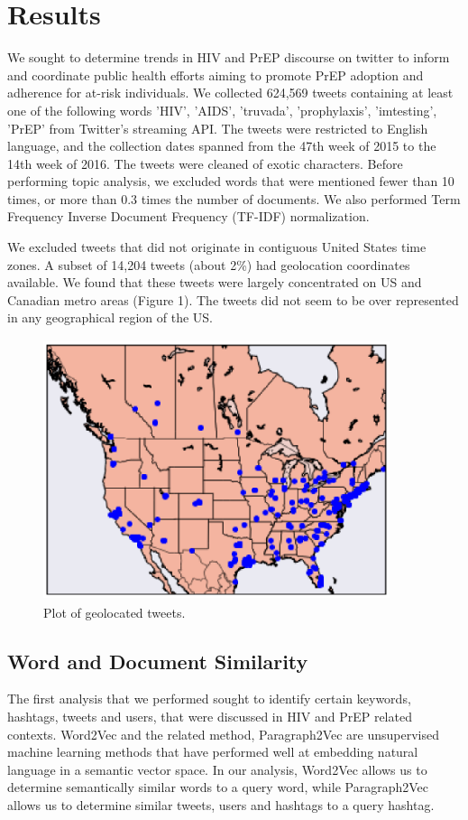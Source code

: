 \documentclass{sig-alternate-05-2015}
\begin{document}
\section{Results}
We sought to determine trends in HIV and PrEP discourse on twitter to inform and coordinate public health efforts aiming to promote PrEP adoption and adherence for at-risk individuals. We collected 624,569 tweets containing at least one of the following words 'HIV', 'AIDS', 'truvada', 'prophylaxis', 'imtesting', 'PrEP' from Twitter's streaming API. The tweets were restricted to English language, and the collection dates spanned from the 47th week of 2015 to the 14th week of 2016. The tweets were cleaned of exotic characters. Before performing topic analysis, we excluded words that were mentioned fewer than 10 times, or more than 0.3 times the number of documents. We also performed Term Frequency Inverse Document Frequency (TF-IDF) normalization.

We excluded tweets that did not originate in contiguous United States time zones. A subset of 14,204 tweets (about 2\%) had geolocation coordinates available. We found that these tweets were largely concentrated on US and Canadian metro areas (Figure 1). The tweets did not seem to be over represented in any geographical region of the US.


\begin{figure}
\centering
\includegraphics[height=3in, width=4in]{map}
\caption{Plot of geolocated tweets.}
\end{figure}

\subsection{Word and Document Similarity}

The first analysis that we performed sought to identify certain keywords, hashtags, tweets and users, that were discussed in HIV and PrEP related contexts. Word2Vec and the related method, Paragraph2Vec are unsupervised machine learning methods that have performed well at embedding natural language in a semantic vector space. In our analysis, Word2Vec allows us to determine semantically similar words to a query word, while Paragraph2Vec allows us to determine similar tweets, users and hashtags to a query hashtag.
\end{document}
